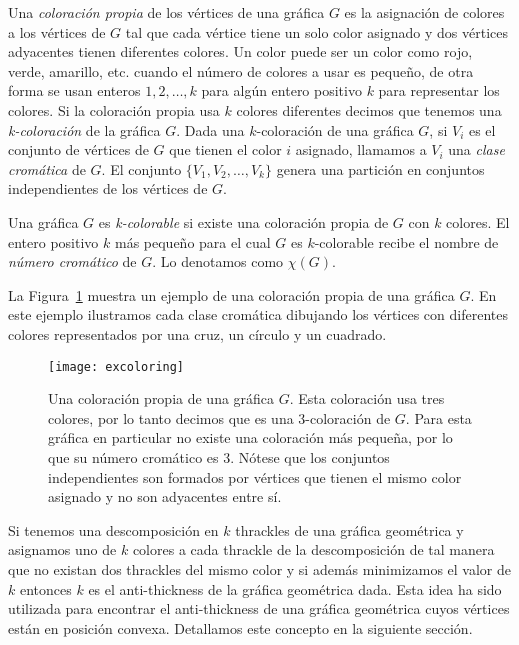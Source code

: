 Una \emph{coloración propia} de los vértices de una gráfica $G$ es la asignación
de colores a los vértices de $G$ tal que cada vértice tiene un solo color
asignado y dos vértices adyacentes tienen diferentes colores.
Un color puede ser un color como rojo, verde, amarillo, etc. cuando el número
de colores a usar es pequeño, de otra forma se usan enteros $1,2,\dots,k$
para algún entero positivo $k$ para representar los colores. Si la coloración
propia usa $k$ colores diferentes decimos que tenemos una \emph{k-coloración}
de la gráfica $G$. Dada una $k$-coloración de una gráfica $G$, si $V_i$ es el
conjunto de vértices de $G$ que tienen el color $i$ asignado, llamamos a $V_i$
una \emph{clase cromática} de $G$. El conjunto $\{V_1,V_2,\dots,V_k\}$ genera
una partición en conjuntos independientes de los vértices de $G$.

Una gráfica $G$ es \emph{k-colorable} si existe una coloración propia de $G$ con $k$
colores. El entero positivo $k$ más pequeño para el cual $G$ es
$k$-colorable recibe el nombre de \emph{número cromático} de $G$. Lo denotamos
como $\chi(G)$.


La Figura~\ref{fig:excoloring} muestra un ejemplo de una coloración propia de
una gráfica $G$. En este ejemplo ilustramos cada clase cromática dibujando los
vértices con diferentes colores representados por una cruz, un círculo y un
cuadrado.
\begin{figure}[htpb]
  \centering
  \texttt{[image: excoloring]}
  \caption{Una coloración propia de una gráfica $G$. Esta coloración usa tres colores, por lo tanto decimos que es una 3-coloración de $G$. Para esta
  gráfica en particular no existe una coloración más pequeña, por lo que su
  número cromático es 3. Nótese que los conjuntos independientes son formados
  por vértices que tienen el mismo color asignado y no son adyacentes entre sí.}
  \label{fig:excoloring}
\end{figure}
Si tenemos una descomposición en $k$ thrackles de una gráfica geométrica y
asignamos uno de $k$ colores a cada thrackle de la descomposición de tal
manera que no existan dos thrackles del mismo color y si además minimizamos
el valor de $k$ entonces $k$ es el anti-thickness de la gráfica geométrica dada.
Esta idea ha sido utilizada para encontrar el anti-thickness de una gráfica
geométrica cuyos vértices están en posición convexa. Detallamos este concepto en
la siguiente sección.

